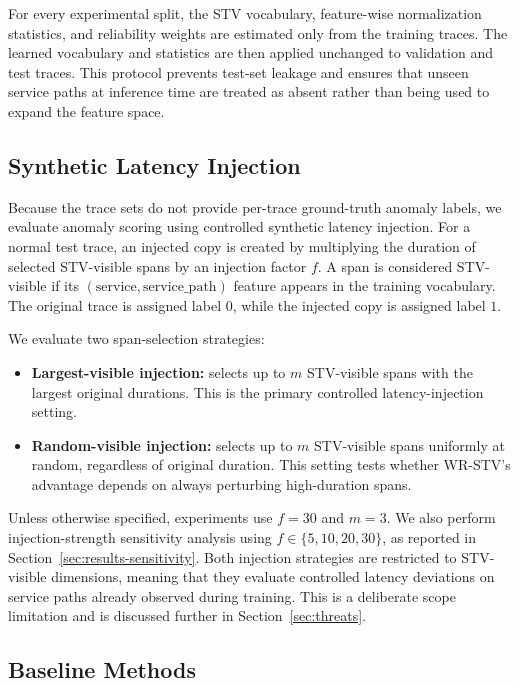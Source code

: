 For every experimental split, the STV vocabulary, feature-wise
normalization statistics, and reliability weights are estimated only from
the training traces. The learned vocabulary and statistics are then
applied unchanged to validation and test traces. This protocol prevents
test-set leakage and ensures that unseen service paths at inference time
are treated as absent rather than being used to expand the feature space.

\subsection{Synthetic Latency Injection}

Because the trace sets do not provide per-trace ground-truth anomaly
labels, we evaluate anomaly scoring using controlled synthetic latency
injection. For a normal test trace, an injected copy is created by
multiplying the duration of selected STV-visible spans by an injection
factor \(f\). A span is considered STV-visible if its
\((\text{service}, \text{service\_path})\) feature appears in the
training vocabulary. The original trace is assigned label \(0\), while
the injected copy is assigned label \(1\).

We evaluate two span-selection strategies:

\begin{itemize}
    \item \textbf{Largest-visible injection:} selects up to \(m\)
    STV-visible spans with the largest original durations. This is the
    primary controlled latency-injection setting.

    \item \textbf{Random-visible injection:} selects up to \(m\)
    STV-visible spans uniformly at random, regardless of original
    duration. This setting tests whether WR-STV's advantage depends on
    always perturbing high-duration spans.
\end{itemize}

Unless otherwise specified, experiments use \(f=30\) and \(m=3\). We
also perform injection-strength sensitivity analysis using
\(f \in \{5,10,20,30\}\), as reported in
Section~\ref{sec:results-sensitivity}. Both injection strategies are
restricted to STV-visible dimensions, meaning that they evaluate
controlled latency deviations on service paths already observed during
training. This is a deliberate scope limitation and is discussed further
in Section~\ref{sec:threats}.

\subsection{Baseline Methods}

